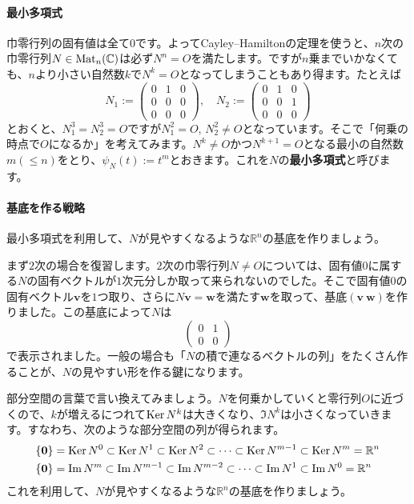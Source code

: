 \paragraph{最小多項式}

巾零行列の固有値は全て$0$です。よってCayley--Hamiltonの定理を使うと、$n$次の巾零行列$N \in \operatorname{Mat}_n(\mathbb{C})$は必ず$N^n = O$を満たします。ですが$n$乗までいかなくても、$n$より小さい自然数$k$で$N^k = O$となってしまうこともあり得ます。たとえば
\[
N_1 :=
\begin{pmatrix}
0 & 1 & 0 \\
0 & 0 & 0 \\
0 & 0 & 0
\end{pmatrix}, \quad
N_2 :=
\begin{pmatrix}
0 & 1 & 0 \\
0 & 0 & 1 \\
0 & 0 & 0
\end{pmatrix}
\]
とおくと、$N_1^3 = N_2^3 = O$ですが$N_1^2 = O$, $N_2^2 \neq O$となっています。そこで「何乗の時点で$O$になるか」を考えてみます。$N^k \neq O$かつ$N^{k + 1} = O$となる最小の自然数$m (\leq n)$をとり、$\psi_N(t) := t^m$とおきます。これを$N$の\textbf{最小多項式}と呼びます。

\paragraph{基底を作る戦略}

最小多項式を利用して、$N$が見やすくなるような$\mathbb{R}^n$の基底を作りましょう。

まず$2$次の場合を復習します。$2$次の巾零行列$N \neq O$については、固有値$0$に属する$N$の固有ベクトルが$1$次元分しか取って来られないのでした。そこで固有値$0$の固有ベクトル$\bm{v}$を$1$つ取り、さらに$N\bm{v} = \bm{w}$を満たす$\bm{w}$を取って、基底$(\bm{v} \ \bm{w})$を作りました。この基底によって$N$は
\[
\begin{pmatrix}
0 & 1 \\
0 & 0
\end{pmatrix}
\]
で表示されました。一般の場合も「$N$の積で連なるベクトルの列」をたくさん作ることが、$N$の見やすい形を作る鍵になります。

部分空間の言葉で言い換えてみましょう。$N$を何乗かしていくと零行列$O$に近づくので、$k$が増えるにつれて$\operatorname{Ker} N^k$は大きくなり、$\Im N^k$は小さくなっていきます。すなわち、次のような部分空間の列が得られます。
\begin{align*}
& \{\boldsymbol{0}\} = \operatorname{Ker} N^0 \subset \operatorname{Ker} N^1 \subset \operatorname{Ker} N^2 \subset \cdots \subset \operatorname{Ker} N^{m - 1} \subset \operatorname{Ker} N^m = \mathbb{R}^n \\
& \{\boldsymbol{0}\} = \mathrm{Im}\, N^m \subset \mathrm{Im}\, N^{m - 1} \subset \mathrm{Im}\, N^{m - 2} \subset \cdots \subset \mathrm{Im}\, N^1 \subset \mathrm{Im}\, N^0 = \mathbb{R}^n
\end{align*}
これを利用して、$N$が見やすくなるような$\mathbb{R}^n$の基底を作りましょう。

